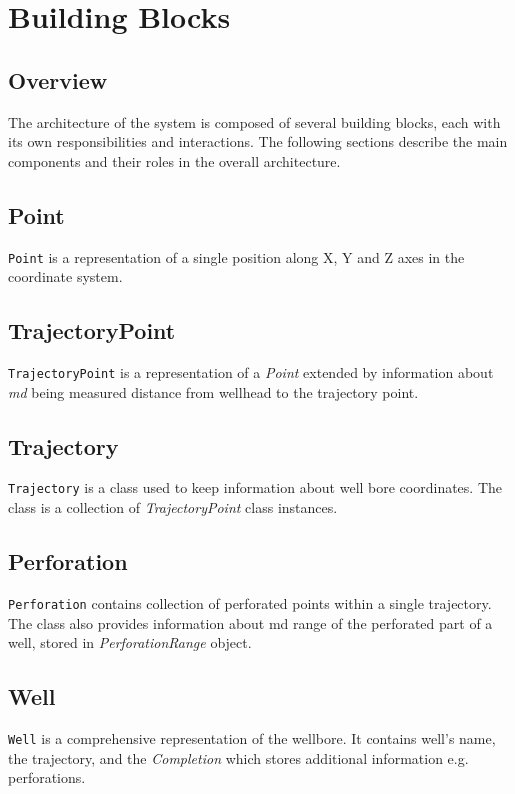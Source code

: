 \section{Building Blocks}
\label{cha:building-blocks}

\subsection{Overview}
\label{sec:overview}

The architecture of the system is composed of several building blocks, each with its own responsibilities and interactions. The following sections describe the main components and their roles in the overall architecture.

\subsection{Point}
	\texttt{Point} is a representation of a single position along X, Y and Z axes in the coordinate system.
	\subsection{TrajectoryPoint}
	\texttt{TrajectoryPoint} is a representation of a \textit{Point} extended by information about \textit{md} being measured distance from wellhead to the trajectory point.
	\subsection{Trajectory}
	\texttt{Trajectory} is a class used to keep information about well bore coordinates.
	The class is a collection of \textit{TrajectoryPoint} class instances.
	\subsection{Perforation}
	\texttt{Perforation} contains collection of perforated points within a single trajectory. The class also provides information about md range of the perforated part of a well, stored in \textit{PerforationRange} object.
	\subsection{Well}
	\texttt{Well} is a comprehensive representation of the wellbore. It contains well's name, the trajectory, and the \textit{Completion} which stores additional information e.g. perforations.
